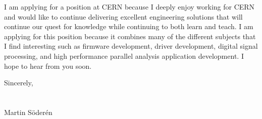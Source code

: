 \documentclass[left=2.5cm,top=2cm,right=2.5cm,bottom=2.5cm]{cv-style}
\begin{document}
I am applying for a position at CERN because I deeply enjoy working for CERN and would like to continue delivering excellent engineering solutions that will continue our quest for knowledge while continuing to both learn and teach. I am applying for this position because it combines many of the different subjects that I find interesting such as firmware development, driver development, digital signal processing, and high performance parallel analysis application development. I hope to hear from you soon.

Sincerely,\\
\\
\\
Martin Söderén
\end{document}
